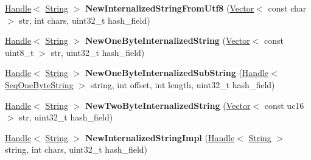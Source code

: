 \begin{DoxyCompactItemize}
\item 
\hyperlink{classv8_1_1internal_1_1_handle}{Handle}$<$ \hyperlink{classv8_1_1internal_1_1_string}{String} $>$ {\bfseries New\+Internalized\+String\+From\+Utf8} (\hyperlink{classv8_1_1internal_1_1_vector}{Vector}$<$ const char $>$ str, int chars, uint32\+\_\+t hash\+\_\+field)\hypertarget{classv8_1_1internal_1_1_factory_a3ff0cb07282e6958ea0bc53da2b90540}{}\label{classv8_1_1internal_1_1_factory_a3ff0cb07282e6958ea0bc53da2b90540}

\item 
\hyperlink{classv8_1_1internal_1_1_handle}{Handle}$<$ \hyperlink{classv8_1_1internal_1_1_string}{String} $>$ {\bfseries New\+One\+Byte\+Internalized\+String} (\hyperlink{classv8_1_1internal_1_1_vector}{Vector}$<$ const uint8\+\_\+t $>$ str, uint32\+\_\+t hash\+\_\+field)\hypertarget{classv8_1_1internal_1_1_factory_a5e8d0556135c56ba6383132a7e6663a3}{}\label{classv8_1_1internal_1_1_factory_a5e8d0556135c56ba6383132a7e6663a3}

\item 
\hyperlink{classv8_1_1internal_1_1_handle}{Handle}$<$ \hyperlink{classv8_1_1internal_1_1_string}{String} $>$ {\bfseries New\+One\+Byte\+Internalized\+Sub\+String} (\hyperlink{classv8_1_1internal_1_1_handle}{Handle}$<$ \hyperlink{classv8_1_1internal_1_1_seq_one_byte_string}{Seq\+One\+Byte\+String} $>$ string, int offset, int length, uint32\+\_\+t hash\+\_\+field)\hypertarget{classv8_1_1internal_1_1_factory_a18c93cf688b0dbece102991fce71c571}{}\label{classv8_1_1internal_1_1_factory_a18c93cf688b0dbece102991fce71c571}

\item 
\hyperlink{classv8_1_1internal_1_1_handle}{Handle}$<$ \hyperlink{classv8_1_1internal_1_1_string}{String} $>$ {\bfseries New\+Two\+Byte\+Internalized\+String} (\hyperlink{classv8_1_1internal_1_1_vector}{Vector}$<$ const uc16 $>$ str, uint32\+\_\+t hash\+\_\+field)\hypertarget{classv8_1_1internal_1_1_factory_ab304b14e0d70c1cf97bcfd0bb296d3d9}{}\label{classv8_1_1internal_1_1_factory_ab304b14e0d70c1cf97bcfd0bb296d3d9}

\item 
\hyperlink{classv8_1_1internal_1_1_handle}{Handle}$<$ \hyperlink{classv8_1_1internal_1_1_string}{String} $>$ {\bfseries New\+Internalized\+String\+Impl} (\hyperlink{classv8_1_1internal_1_1_handle}{Handle}$<$ \hyperlink{classv8_1_1internal_1_1_string}{String} $>$ string, int chars, uint32\+\_\+t hash\+\_\+field)\hypertarget{classv8_1_1internal_1_1_factory_ab71713e88964354c50218f7fb5f24829}{}\label{classv8_1_1internal_1_1_factory_ab71713e88964354c50218f7fb5f24829}


\end{DoxyCompactItemize}
